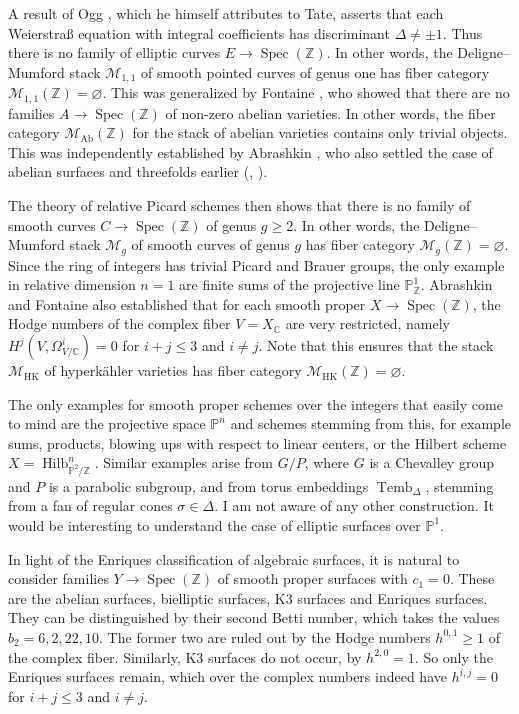 \documentclass[oneside, 12pt]{amsart}
\theoremstyle{definition}
\theoremstyle{remark}
\newcommand{\ZZ}{\mathbb{Z}}
\newcommand{\CC}{\mathbb{C}}
\newcommand{\PP}{\mathbb{P}}
\newcommand{\shM}{\mathscr{M}}
\newcommand{\Hilb}{\operatorname{Hilb}}
\newcommand{\ra}{\rightarrow}
\newcommand{\Spec}{\operatorname{Spec}}
\begin{document}
A result of Ogg \cite{Ogg 1966}, which he himself attributes to Tate, asserts that each Weierstra\ss{} equation with integral 
coefficients has discriminant $\Delta\neq \pm 1$. 
Thus there is no family of elliptic curves
$E\ra\Spec(\ZZ)$. In other words, the Deligne--Mumford stack $\shM_{1,1}$ of smooth pointed curves of genus one
has  fiber category $\shM_{1,1}(\ZZ)=\varnothing$.
This was generalized by Fontaine \cite{Fontaine 1985},
who showed that there are no families $A\ra\Spec(\ZZ)$  of non-zero abelian varieties.
In other words, the  fiber category $\shM_{\text{Ab}}(\ZZ)$ for the  stack  
of   abelian varieties contains only  trivial objects.
This was independently established by Abrashkin \cite{Abrashkin 1985}, who also settled the case of abelian surfaces and   threefolds earlier
(\cite{Abrashkin 1976}, \cite{Abrashkin 1977}).

The theory   of relative Picard schemes \cite{FGA V} then shows that there is no family of smooth curves $C\ra\Spec(\ZZ)$
of genus $g\geq 2$. In other words, the Deligne--Mumford stack $\shM_g$ of smooth curves of genus $g$ has fiber category
$\shM_g(\ZZ)=\varnothing$.
Since the ring of integers has trivial Picard and Brauer groups, the only example in relative dimension $n=1$
are finite sums of the projective line $\PP^1_\ZZ$.
Abrashkin \cite{Abrashkin 1990} and Fontaine \cite{Fontaine 1993}   
also established that for each smooth proper $X\ra\Spec(\ZZ)$, the Hodge numbers of the complex fiber $V=X_\CC$
are very restricted, namely
$H^j(V,\Omega^i_{V/\CC}) = 0$ for $i+j\leq 3$ and $i\neq j$.
Note that this ensures that the   stack $\shM_{\text{HK}}$ of hyperk\"ahler varieties has fiber category 
$\shM_{\text{HK}}(\ZZ)=\varnothing$.

The only examples for smooth proper schemes over the integers that easily come to mind
are  the projective space $\PP^n$ and schemes   stemming from this,
for example sums, products,   blowing ups with respect to linear centers, or the Hilbert scheme 
$X=\Hilb^n_{\PP^2/\ZZ}$.
Similar examples arise from $G/P$, where $G$ is a Chevalley group  and $P$ is a  parabolic subgroup,
and from   torus embeddings $\operatorname{Temb}_\Delta$, stemming from a  fan of regular cones $\sigma\in\Delta$.
I am not aware of any other construction. It would be interesting to understand the case of   elliptic surfaces over $\PP^1$.

In light of the Enriques classification of algebraic surfaces, it is natural to consider  families
$Y\ra \Spec(\ZZ)$ of smooth proper surfaces with $c_1=0$. 
These are the abelian surfaces, bielliptic surfaces, K3 surfaces and Enriques surfaces.
They can be distinguished by their second Betti number, which takes the   values $b_2=6,2,22,10$.
The former two are ruled out by the Hodge numbers $h^{0,1}\geq 1$ of the complex fiber. Similarly, K3 surfaces do not 
occur, by $h^{2,0}=1$.
So only the Enriques surfaces remain, which over the complex numbers indeed have $h^{i,j}=0$ for $i+j\leq 3$ and $i\neq j$.
\end{document}
